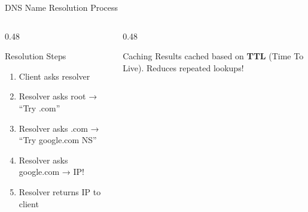 \documentclass[aspectratio=169, 11pt]{beamer}
\begin{document}
\begin{frame}{DNS Name Resolution Process}
\begin{center}
    \end{center}
    
    \vspace{0.2em}
    \begin{columns}[T]
        \begin{column}{0.48\textwidth}
            \begin{block}{Resolution Steps}
                \footnotesize
                \begin{enumerate}\setlength{\itemsep}{0pt}
                    \item Client asks resolver
                    \item Resolver asks root → ``Try .com''
                    \item Resolver asks .com → ``Try google.com NS''
                    \item Resolver asks google.com → IP!
                    \item Resolver returns IP to client
                \end{enumerate}
            \end{block}
        \end{column}
        \begin{column}{0.48\textwidth}
            \begin{exampleblock}{Caching}
                \small
                Results cached based on \textbf{TTL} (Time To Live). Reduces repeated lookups!
            \end{exampleblock}
        \end{column}
    \end{columns}
\end{frame}
\end{document}
